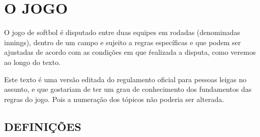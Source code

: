 \chapter{O JOGO}

\begin{multicols}{2} 
	O jogo de softbol \'e disputado entre duas equipes em rodadas (denominadas \glspl{inning}), dentro de um campo e sujeito a regras espec\'ificas e que podem ser ajustadas de acordo com as condi\c{c}\~oes em que \' realizada a disputa, como veremos ao longo do texto. 
	
	Este texto \'e uma vers\~ao editada do regulamento oficial para pessoas leigas no assunto, e que gostariam de ter um grau de conhecimento dos fundamentos das regras do jogo. Pois a numera\c{c}\~ao dos t\'opicos n\~ao poderia ser alterada.

	
\end{multicols}


\section{DEFINI\c{C}\~OES}


